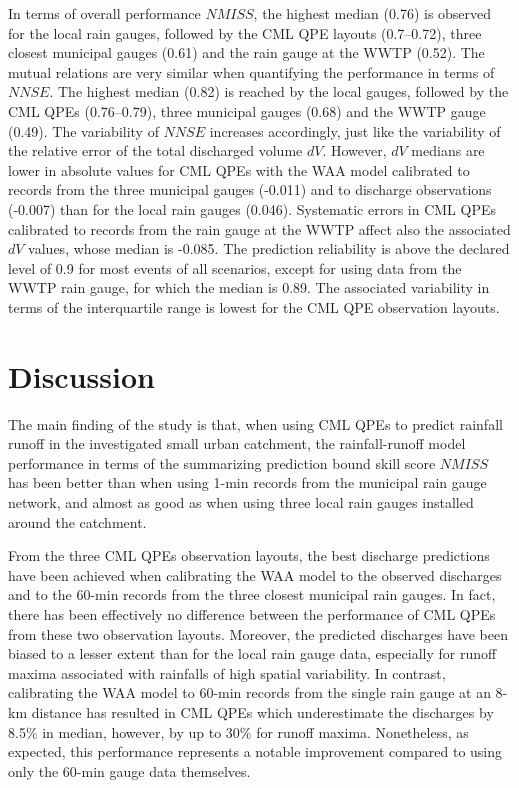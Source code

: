 \documentclass{ctuthesis}\usepackage[]{graphicx}\usepackage[]{color}
\begin{document}
In terms of overall performance $N\!M\!I\!S\!S$, the highest median (0.76) is observed for the local rain gauges, followed by the CML QPE layouts (0.7--0.72), three closest municipal gauges (0.61) and the rain gauge at the WWTP (0.52). The mutual relations are very similar when quantifying the performance in terms of  $N\!N\!S\!E$. The highest median (0.82) is reached by the local gauges, followed by the CML QPEs (0.76--0.79), three municipal gauges (0.68) and the WWTP gauge (0.49). The variability of $N\!N\!S\!E$ increases accordingly, just like the variability of the relative error of the total discharged volume $dV$. However, $dV$ medians are lower in absolute values for CML QPEs with the WAA model calibrated to records from the three municipal gauges (-0.011) and to discharge observations (-0.007) than for the local rain gauges (0.046). Systematic errors in CML QPEs calibrated to records from the rain gauge at the WWTP affect also the associated $dV$ values, whose median is -0.085. The prediction reliability is above the declared level of 0.9 for most events of all scenarios, except for using data from the WWTP rain gauge, for which the median is 0.89. The associated variability in terms of the interquartile range is lowest for the CML QPE observation layouts.






\section{Discussion} \label{paperIIIDis}

The main finding of the study is that, when using CML QPEs to predict rainfall runoff in the investigated small urban catchment, the rainfall-runoff model performance in terms of the summarizing prediction bound skill score $N\!M\!I\!S\!S$ has been better than when using 1-min records from the municipal rain gauge network, and almost as good as when using three local rain gauges installed around the catchment. 

From the three CML QPEs observation layouts, the best discharge predictions have been achieved when calibrating the WAA model to the observed discharges and to the 60-min records from the three closest municipal rain gauges. In fact, there has been effectively no difference between the performance of CML QPEs from these two observation layouts. Moreover, the predicted discharges have been biased to a lesser extent than for the local rain gauge data, especially for runoff maxima associated with rainfalls of high spatial variability.  In contrast, calibrating the WAA model to 60-min records from the single rain gauge at an 8-km distance has resulted in CML QPEs which underestimate the discharges by 8.5\%  in median, however, by up to 30\% for runoff maxima. Nonetheless, as expected, this performance represents a notable improvement compared to using only the 60-min gauge data themselves.
\end{document}
